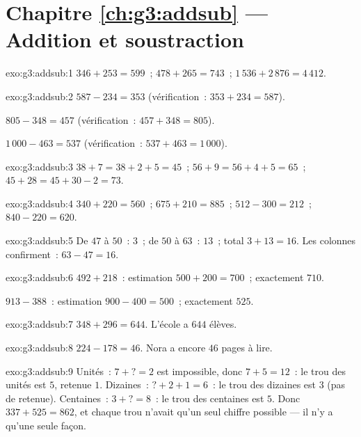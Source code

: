 \section*{Chapitre \ref{ch:g3:addsub} --- Addition et soustraction}

\begin{solution}{exo:g3:addsub:1}
$346 + 253 = 599$~; \quad
$478 + 265 = 743$~; \quad
$1\,536 + 2\,876 = 4\,412$.
\end{solution}

\begin{solution}{exo:g3:addsub:2}
$587 - 234 = 353$ (vérification~: $353 + 234 = 587$).

$805 - 348 = 457$ (vérification~: $457 + 348 = 805$).

$1\,000 - 463 = 537$ (vérification~: $537 + 463 = 1\,000$).
\end{solution}

\begin{solution}{exo:g3:addsub:3}
$38 + 7 = 38 + 2 + 5 = 45$~; \quad
$56 + 9 = 56 + 4 + 5 = 65$~; \quad
$45 + 28 = 45 + 30 - 2 = 73$.
\end{solution}

\begin{solution}{exo:g3:addsub:4}
$340 + 220 = 560$~; \quad $675 + 210 = 885$~; \quad
$512 - 300 = 212$~; \quad $840 - 220 = 620$.
\end{solution}

\begin{solution}{exo:g3:addsub:5}
De $47$ à $50$~: $3$~; de $50$ à $63$~: $13$~; total
$3 + 13 = 16$. Les colonnes confirment~: $63 - 47 = 16$.
\end{solution}

\begin{solution}{exo:g3:addsub:6}
$492 + 218$~: estimation $500 + 200 = 700$~; exactement $710$.

$913 - 388$~: estimation $900 - 400 = 500$~; exactement $525$.
\end{solution}

\begin{solution}{exo:g3:addsub:7}
$348 + 296 = 644$. L'école a $644$ élèves.
\end{solution}

\begin{solution}{exo:g3:addsub:8}
$224 - 178 = 46$. Nora a encore $46$ pages à lire.
\end{solution}

\begin{solution}{exo:g3:addsub:9}
Unités~: $7 + \text{?} = 2$ est impossible, donc $7 + 5 = 12$~: le
trou des unités est $5$, retenue $1$. Dizaines~:
$\text{?} + 2 + 1 = 6$~: le trou des dizaines est $3$ (pas de
retenue). Centaines~: $3 + \text{?} = 8$~: le trou des centaines est
$5$. Donc $337 + 525 = 862$, et chaque trou n'avait qu'un seul
chiffre possible --- il n'y a qu'une seule façon.
\end{solution}

